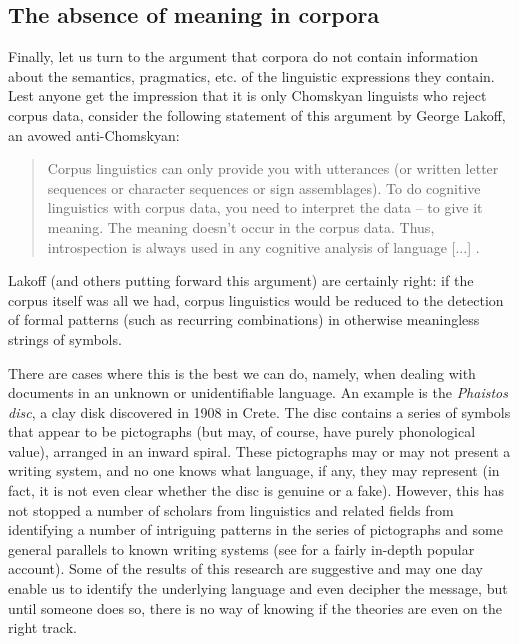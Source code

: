 \subsection{The absence of meaning in corpora}
\label{sec:absenceofmeaningincorpora}

Finally, let us turn to the argument that corpora do not contain information about the semantics,  pragmatics,  etc. of the linguistic expressions they contain. Lest anyone get the impression that it is only Chomskyan linguists who reject corpus data, consider the following statement of this argument by George Lakoff, an avowed anti\hyp{}Chomskyan:

\begin{quote}
Corpus linguistics can only provide you with utterances (or written  letter sequences or character sequences or sign assemblages). To do cognitive  linguistics with corpus data, you need to interpret the data -- to give it meaning.  The meaning doesn't occur in the corpus data. Thus, introspection  is always used in any cognitive analysis of language [...] \citep{lakoff_re:_2004}.
\end{quote}

Lakoff (and others putting forward this argument) are certainly right: if the corpus itself was all we had, corpus linguistics would be reduced to the detection of formal patterns (such as recurring combinations) in otherwise meaningless strings of symbols.

There are cases where this is the best we can do, namely, when dealing with documents in an unknown or unidentifiable language. An example is the \emph{Phaistos disc}, a clay disk discovered in 1908 in Crete. The disc contains a series of symbols that appear to be pictographs (but may, of course, have purely phonological value), arranged in an inward spiral. These pictographs may or may not present a writing  system, and no one knows what language, if any, they may represent (in fact, it is not even clear whether the disc is genuine or a fake). However, this has not stopped a number of scholars from linguistics and related fields from identifying a number of intriguing patterns in the series of pictographs and some general parallels to known writing systems (see \citet[ch. 11]{robinson_lost_2002} for a fairly in\hyp{}depth popular account). Some of the results of this research are suggestive and may one day enable us to identify the underlying language and even decipher the message, but until someone does so, there is no way of knowing if the theories are even on the right track.

